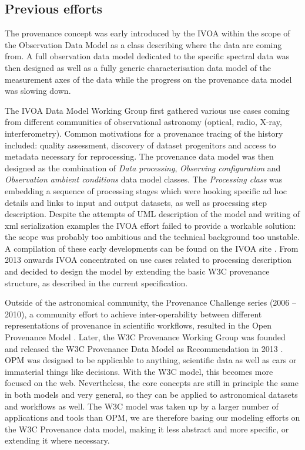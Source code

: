 \subsection{Previous efforts}
The provenance concept was early introduced by the IVOA within the scope of the Observation Data Model \citep[see IVOA note by ][]{note:observationdm} as a class describing where the data are coming from. A full observation data model dedicated to the specific spectral data was then designed \citep[Spectral Data Model,][]{std:SpectralDM} as well as a fully generic characterisation data model of the measurement axes of the data \citep[Characterisation Data Model,][]{std:CharacterisationDM} while the progress on the provenance data model was slowing down.

The IVOA Data Model Working Group first gathered various use cases coming from different communities of observational astronomy (optical, radio, X-ray, interferometry). Common motivations for a provenance tracing of the history included: quality assessment, discovery of dataset progenitors and access to metadata necessary for reprocessing. The provenance data model was then designed as the combination of \emph{Data processing}, \emph{Observing configuration} and \emph{Observation ambient conditions} data model classes. 
The \emph{Processing class} was embedding a sequence of processing stages which were hooking specific ad hoc details and links to input and output datasets, as well as processing step description. 
Despite the attempts of UML description of the model and writing of xml serialization examples the IVOA effort failed to provide a workable solution: the scope was probably too ambitious and the technical background too unstable. A compilation of these early developments can be found on the IVOA site \citep{std:previousefforts}. From 2013 onwards IVOA concentrated on use cases related to processing description and decided to design the model by extending the basic W3C provenance structure, as described in the current specification. 

Outside of the astronomical community, the Provenance Challenge series (2006 -- 2010), a community effort to achieve inter-operability between different representations of provenance in scientific workflows, resulted in the Open Provenance Model \citep{moreau2010}. 
Later, the W3C Provenance Working Group was founded and released the W3C Provenance Data Model as Recommendation in 2013 \citep{std:W3CProvDM}. 
OPM was designed to be applicable to anything, scientific data as well as cars or immaterial things like decisions. With the W3C model, this becomes more focused on the web. Nevertheless, the core concepts are still in principle the same in both models and very general, so they can be applied to astronomical datasets and workflows as well. 
The W3C model was taken up by a larger number of applications and tools than OPM, we are therefore basing our modeling efforts on the W3C Provenance data model, making it less abstract and more specific, or extending it where necessary. 


